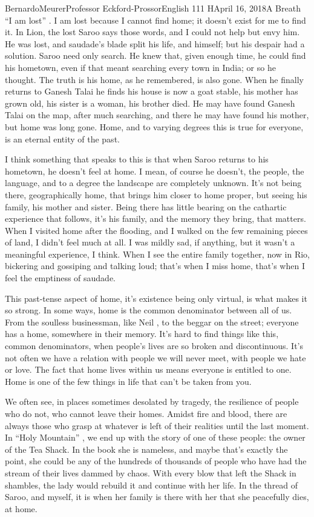 \documentclass[12pt,letterpaper]{article}
\begin{document}
\begin{mla}{Bernardo}{Meurer}{Professor Eckford-Prossor}{English 111 H}{April 16, 2018}{A Breath}
	``I am lost'' \autocite{lion_2016}. I am lost because I cannot find home; it doesn't exist for me to find it. In Lion, the lost Saroo says those words, and I could not help but envy him. He was lost, and saudade's blade split his life, and himself; but his despair had a solution. Saroo need only search. He knew that, given enough time, he could find his hometown, even if that meant searching every town in India; or so he thought. The truth is his home, as he remembered, is also gone. When he finally returns to Ganesh Talai he finds his house is now a goat stable, his mother has grown old, his sister is a woman, his brother died. He may have found Ganesh Talai on the map, after much searching, and there he may have found his mother, but home was long gone. Home, and to varying degrees this is true for everyone, is an eternal entity of the past.

	I think something that speaks to this is that when Saroo returns to his hometown, he doesn't feel at home. I mean, of course he doesn't, the people, the language, and to a degree the landscape are completely unknown. It's not being there, geographically home, that brings him closer to home proper, but seeing his family, his mother and sister. Being there has little bearing on the cathartic experience that follows, it's his family, and the memory they bring, that matters. When I visited home after the flooding, and I walked on the few remaining pieces of land, I didn't feel much at all. I was mildly sad, if anything, but it wasn't a meaningful experience, I think. When I see the entire family together, now in Rio, bickering and gossiping and talking loud; that's when I miss home, that's when I feel the emptiness of saudade.

	This past-tense aspect of home, it's existence being only virtual, is what makes it so strong. In some ways, home is the common denominator between all of us. From the soulless businessman, like Neil \autocite{mitchell_2001}, to the beggar on the street; everyone has a home, somewhere in their memory. It's hard to find things like this, common denominators, when people's lives are so broken and discontinuous. It's not often we have a relation with people we will never meet, with people we hate or love. The fact that home lives within us means everyone is entitled to one. Home is one of the few things in life that can't be taken from you.

	We often see, in places sometimes desolated by tragedy, the resilience of people who do not, who cannot leave their homes. Amidst fire and blood, there are always those who grasp at whatever is left of their realities until the last moment. In ``Holy Mountain'' \autocite{mitchell_2001}, we end up with the story of one of these people: the owner of the Tea Shack. In the book she is nameless, and maybe that's exactly the point, she could be any of the hundreds of thousands of people who have had the stream of their lives dammed by chaos. With every blow that left the Shack in shambles, the lady would rebuild it and continue with her life. In the thread of Saroo, and myself, it is when her family is there with her that she peacefully dies, at home.


\end{mla}
\end{document}
